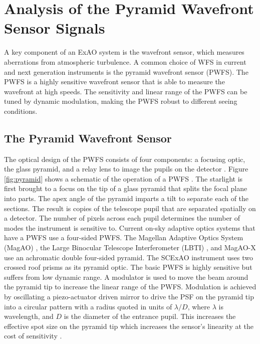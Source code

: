 \chapter{Analysis of the Pyramid Wavefront Sensor Signals}\label{CH3}

A key component of an ExAO system is the wavefront sensor, which measures aberrations from atmospheric turbulence. A common choice of WFS in current and next generation instruments is the pyramid wavefront sensor (PWFS). The PWFS is a highly sensitive wavefront sensor that is able to measure the wavefront at high speeds. The sensitivity and linear range of the PWFS can be tuned by dynamic modulation, making the PWFS robust to different seeing conditions. 

\section{The Pyramid Wavefront Sensor}\label{PWFSintro}
The optical design of the PWFS consists of four components: a focusing optic, the glass pyramid, and a relay lens to image the pupils on the detector \citep{ragazzoni2002pyramid}. Figure \ref{fig:pyramid} shows a schematic of the operation of a PWFS \citep{pyramidfig}.  The starlight is first brought to a focus on the tip of a glass pyramid that splits the focal plane into parts. The apex angle of the pyramid imparts a tilt to separate each of the sections. The result is copies of the telescope pupil that are separated spatially on a detector. The number of pixels across each pupil determines the number of modes the instrument is sensitive to. Current on-sky adaptive optics systems that have a PWFS use a four-sided PWFS. The Magellan Adaptive Optics System (MagAO) \citep{close2018status}, the Large Binocular Telescope Interferometer (LBTI) \citep{esposito2011adaptive}, and MagAO-X use an achromatic double four-sided pyramid. The SCExAO instrument uses two crossed roof prisms as its pyramid optic. The basic PWFS is highly sensitive but suffers from low dynamic range. A modulator is used to move the beam around the pyramid tip to increase the linear range of the PWFS. Modulation is achieved by oscillating a piezo-actuator driven mirror to drive the PSF on the pyramid tip into a circular pattern with a radius quoted in units of $\lambda/D$, where $\lambda$ is wavelength, and $D$ is the diameter of the entrance pupil. This increases the effective spot size on the pyramid tip which increases the sensor's linearity at the cost of sensitivity \citep{guyon2005}.  

